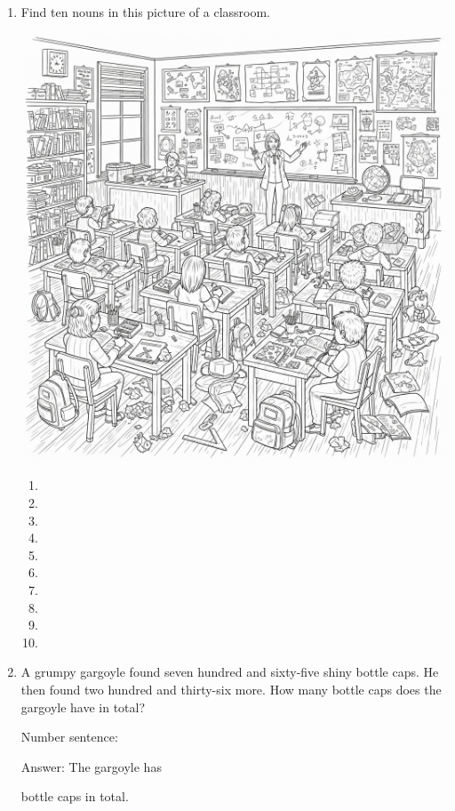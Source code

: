 \documentclass{tufte-book}
\begin{document}
\begin{enumerate}
  \item Find ten nouns in this picture of a classroom.\bigskip
  \begin{marginfigure}\includegraphics[width=\textwidth]{grammar/classroom.png}\end{marginfigure}
\begin{multicols}{2}
  \begin{enumerate}
    \item \dotfill\bigskip
    \item \dotfill\bigskip
    \item \dotfill\bigskip
    \item \dotfill\bigskip
    \item \dotfill
    \item \dotfill\bigskip
    \item \dotfill\bigskip
    \item \dotfill\bigskip
    \item \dotfill\bigskip
    \item \dotfill\bigskip
  \end{enumerate}
\end{multicols}

\item A grumpy gargoyle found seven hundred and sixty-five shiny bottle caps.
He then found two hundred and thirty-six more.
How many bottle caps does the gargoyle have in total?\bigskip\par
Number sentence: \dotfill\bigskip\par
Answer: The gargoyle has 
\dotfill\medskip\par\mbox{}\dotfill\medskip\par\mbox{}\dotfill\bigskip
 bottle caps in total.


\end{enumerate}
\end{document}
